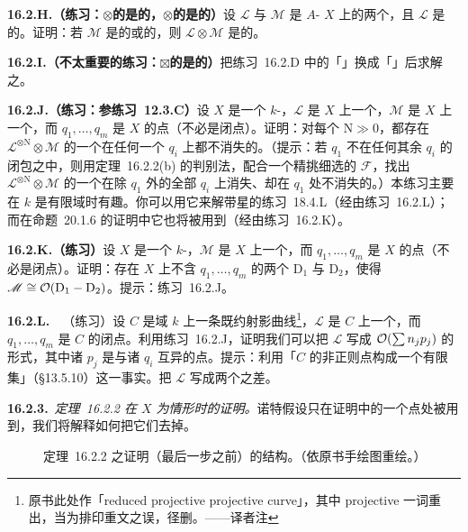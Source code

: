 \textbf{16.2.H.（练习：\trAmple{}$\otimes$\trAmple{}的是\trAmple{}的，\trAmple{}$\otimes$\trBasePointFree{}的是\trAmple{}的）}\quad 设 $\mathscr{L}$ 与 $\mathscr{M}$ 是\trProper{} $A$-\trScheme{} $X$ 上的两个\trInvertibleSheaf，且 $\mathscr{L}$ 是\trAmple{}的。证明：若 $\mathscr{M}$ 是\trAmple{}的或\trBasePointFree{}的，则 $\mathscr{L}\otimes\mathscr{M}$ 是\trAmple{}的。

\textbf{16.2.I.（不太重要的练习：\trAmple{}$\boxtimes$\trAmple{}的是\trAmple{}的）}\quad 把\mbox{练习~16.2.D} 中的「\trVeryAmple」换成「\trAmple」后求解之。

\textbf{16.2.J.（练习：参\mbox{练习~12.3.C}）}\quad 设 $X$ 是一个\trProjective{} $k$-\trScheme，$\mathscr{L}$ 是 $X$ 上一个\trAmple\trLineBundle，$\mathscr{M}$ 是 $X$ 上一个\trLineBundle，而 $q_1,\dots,q_m$ 是 $X$ 的点（不必是闭点）。证明：对每个 $\mathrm{N}\gg 0$，都存在 $\mathscr{L}^{\otimes\mathrm{N}}\otimes\mathscr{M}$ 的一个在任何一个 $q_i$ 上都不消失的\trSection。（提示：若 $q_1$ 不在任何其余 $q_i$ 的闭包之中，则用\mbox{定理~16.2.2}(b) 的判别法，配合一个精挑细选的 $\mathscr{F}$，找出 $\mathscr{L}^{\otimes\mathrm{N}}\otimes\mathscr{M}$ 的一个在除 $q_1$ 外的全部 $q_i$ 上消失、却在 $q_1$ 处不消失的\trSection。）本练习主要在 $k$ 是有限域时有趣。你可以用它来解带星的\mbox{练习~18.4.L}（经由\mbox{练习~16.2.L}）；而在\mbox{命题~20.1.6} 的证明中它也将被用到（经由\mbox{练习~16.2.K}）。

\textbf{16.2.K.（练习）}\quad 设 $X$ 是一个\trProjective{} $k$-\trScheme，$\mathscr{M}$ 是 $X$ 上一个\trLineBundle，而 $q_1,\dots,q_m$ 是 $X$ 的点（不必是闭点）。证明：存在 $X$ 上不含 $q_1,\dots,q_m$ 的两个\trEffectiveCartierDivisor{} $\mathrm{D}_1$ 与 $\mathrm{D}_2$，使得 $\mathscr{M}\cong\mathcal{O}(\mathrm{D}_1-\mathrm{D}_2)$。提示：\mbox{练习~16.2.J}。

\textbf{16.2.L.}\ \hard\ （练习）\quad 设 $C$ 是域 $k$ 上一条既约射影曲线\footnote{原书此处作「reduced projective projective curve」，其中 projective 一词重出，当为排印重文之误，径删。——译者注}，$\mathscr{L}$ 是 $C$ 上一个\trLineBundle，而 $q_1,\dots,q_m$ 是 $C$ 的闭点。利用\mbox{练习~16.2.J}，证明我们可以把 $\mathscr{L}$ 写成 $\mathcal{O}(\sum n_jp_j)$ 的形式，其中诸 $p_j$ 是与诸 $q_i$ 互异的\trRegular{}点。提示：利用「$C$ 的非正则点构成一个有限集」（\S13.5.10）这一事实。把 $\mathscr{L}$ 写成两个\trVeryAmple\trLineBundle{}之差。

\textbf{16.2.3.}\ \emph{\mbox{定理~16.2.2} 在 $X$ 为\trNoether{}情形时的证明。}\quad 诺特假设只在证明中的一个点处被用到，我们将解释如何把它们去掉。

\begin{figure}[htbp]
\centering
{}
\caption{\mbox{定理~16.2.2} 之证明（最后一步之前）的结构。（依原书手绘图重绘。）}\label{fig:ample-proof-structure}
\end{figure}


